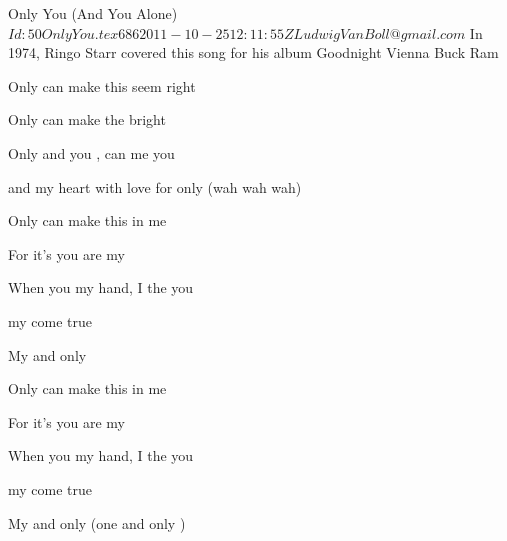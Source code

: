 \begin{SBSong}{Only You (And You Alone)}
  {$Id: 50OnlyYou.tex 686 2011-10-25 12:11:55Z LudwigVanBoll@gmail.com $}
  {In 1974, Ringo Starr covered this song for his album Goodnight Vienna}
  {Buck Ram}
  \begin{SBVerse}
    Only  can make this  seem right

    Only  can make the  bright 

    Only  and you , can  me  you 

    and  my heart with love for only  (wah wah wah)
  \end{SBVerse}
  \begin{SBVerse}
    Only  can make this  in me

    For it's  you are my  

    When you  my hand, I  the   you 

     my  come true

    My  and only 
  \end{SBVerse}
  \begin{SBVerse}
    Only  can make this  in me

    For it's  you are my  

    When you  my hand, I  the   you 

     my  come true

    My  and only  (one and only )
  \end{SBVerse}
\end{SBSong}